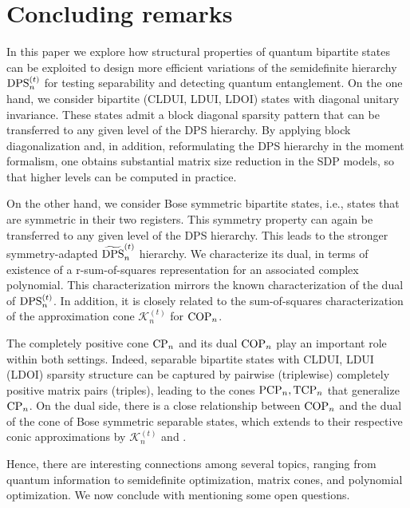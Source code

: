 \documentclass[11pt]{article}
\newcommand{\MK}{{\mathcal K}}
\newcommand{\PCP}{\text{\rm PCP}}
\newcommand{\TCP}{\text{\rm TCP}}
\newcommand{\CP}{\text{\rm CP}}
\newcommand{\COP}{\text{\rm COP}}
\newcommand{\DPS}{\text{\rm DPS}}
\newcommand{\tilDPS}{\widetilde {\DPS}}
\theoremstyle{plain}
\begin{document}

\section{Concluding remarks}\label{sec:conclusion}

In this paper we explore how structural properties of quantum bipartite states  can be exploited to design more efficient variations of the  semidefinite   hierarchy $\DPS^{(t)}_n$ for testing separability and detecting quantum entanglement.   
On the one hand, we consider bipartite (CLDUI, LDUI, LDOI) states with diagonal unitary invariance.
 These states admit  a    block diagonal sparsity pattern that can be transferred to any given level of the DPS hierarchy. By applying block diagonalization and, in addition, reformulating the DPS hierarchy in the moment formalism, one obtains substantial matrix size reduction in the SDP models,
 so that higher levels can be computed in practice. 
 
On the other hand, we consider Bose symmetric   bipartite states, i.e., states that are symmetric in their two registers. This symmetry property can again be transferred to any given level of the DPS hierarchy. This leads to the stronger symmetry-adapted $\tilDPS^{(t)}_n$ hierarchy. We characterize its  dual, in terms of existence of a r-sum-of-squares representation for an associated complex  polynomial. This characterization mirrors the known characterization of the dual of $\DPS^{(t)}_n$. In addition, it is   closely related to the sum-of-squares characterization of the approximation cone $\MK^{(t)}_n$ for $\COP_n$.

The completely positive cone $\CP_n$ and its dual $\COP_n$ play an important role within both settings. Indeed, separable bipartite states with CLDUI, LDUI (LDOI) sparsity structure can be captured by  pairwise (triplewise)  completely positive matrix pairs (triples), leading to the cones $\PCP_n,\TCP_n$ that generalize $\CP_n$. On the dual side, there is a close relationship between   $\COP_n$ and the dual of the cone of Bose symmetric separable states, which extends  to their respective conic approximations by $\MK^{(t)}_n$ and \smash{$(\tilDPS^{(t)}_n)^*$}.  

Hence, there are interesting connections among several topics, ranging from quantum information to semidefinite optimization, matrix cones, and polynomial optimization. 
We now conclude with mentioning some open  questions.
\end{document}
